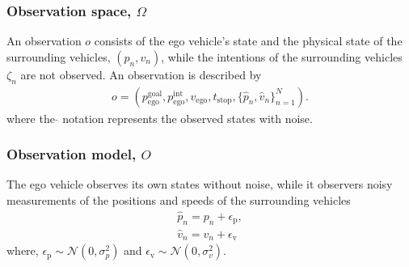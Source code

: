 \subsubsection{Observation space, $\Omega$}
\label{sec:observation_space}
An observation $o$ consists of the ego vehicle's state and the physical state of the surrounding vehicles, $(p_n, v_n)$, while the intentions of the surrounding vehicles $\zeta_n$ are not observed. An observation is described by
\begin{align}
    \label{eq:observation}
    o = (p_\mathrm{ego}^\mathrm{goal},p_\mathrm{ego}^\mathrm{int}, v_\mathrm{ego}, t_\mathrm{stop}, \{\hat{p}_{n}, \hat{v}_n\}_{n=1}^N).
\end{align}
where the $\hat{}$ notation represents the observed states with noise.

\subsubsection{Observation model, $O$}

The ego vehicle observes its own states without noise, 
while it observers noisy measurements of the positions and speeds of the surrounding vehicles 
\begin{align}
    \label{eq:noise_pos}
    \hat{p}_{n} = p_{n} + \epsilon_\mathrm{p},\\ 
    \hat{v}_n = v_n + \epsilon_\mathrm{v}
    \label{eq:noise_vel}
\end{align}
where, $\epsilon_\mathrm{p} \sim \mathcal{N}(0, \sigma^2_p)$ and $\epsilon_\mathrm{v} \sim \mathcal{N}(0, \sigma^2_v)$. 



